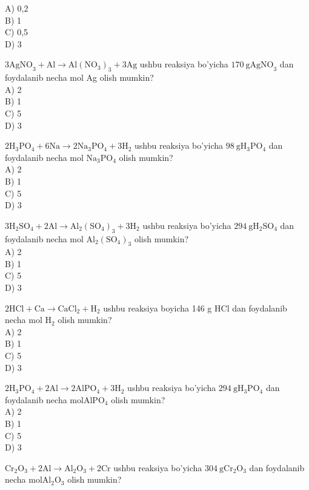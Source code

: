 A) 0,2\\
B) 1\\
C) 0,5\\
D) 3
  \item $3 \mathrm{AgNO}_{3}+\mathrm{Al} \rightarrow \mathrm{Al}\left(\mathrm{NO}_{3}\right)_{3}+3 \mathrm{Ag}$ ushbu reaksiya bo'yicha $170 \mathrm{~g} \mathrm{AgNO}_{3}$ dan foydalanib necha mol Ag olish mumkin?\\
A) 2\\
B) 1\\
C) 5\\
D) 3
  \item $2 \mathrm{H}_{3} \mathrm{PO}_{4}+6 \mathrm{Na} \rightarrow 2 \mathrm{Na}_{3} \mathrm{PO}_{4}+3 \mathrm{H}_{2}$ ushbu reaksiya bo'yicha $98 \mathrm{~g} \mathrm{H}_{3} \mathrm{PO}_{4}$ dan foydalanib necha mol $\mathrm{Na}_{3} \mathrm{PO}_{4}$ olish mumkin?\\
A) 2\\
B) 1\\
C) 5\\
D) 3
  \item $3 \mathrm{H}_{2} \mathrm{SO}_{4}+2 \mathrm{Al} \rightarrow \mathrm{Al}_{2}\left(\mathrm{SO}_{4}\right)_{3}+3 \mathrm{H}_{2}$ ushbu reaksiya bo'yicha $294 \mathrm{~g} \mathrm{H}_{2} \mathrm{SO}_{4}$ dan foydalanib necha mol $\mathrm{Al}_{2}\left(\mathrm{SO}_{4}\right)_{3}$ olish mumkin?\\
A) 2\\
B) 1\\
C) 5\\
D) 3
  \item $2 \mathrm{HCl}+\mathrm{Ca} \rightarrow \mathrm{CaCl}_{2}+\mathrm{H}_{2}$ ushbu reaksiya boyicha 146 g HCl dan foydalanib necha mol $\mathrm{H}_{2}$ olish mumkin?\\
A) 2\\
B) 1\\
C) 5\\
D) 3
  \item $2 \mathrm{H}_{3} \mathrm{PO}_{4}+2 \mathrm{Al} \rightarrow 2 \mathrm{AlPO}_{4}+3 \mathrm{H}_{2}$ ushbu reaksiya bo'yicha $294 \mathrm{~g} \mathrm{H}_{3} \mathrm{PO}_{4}$ dan foydalanib necha $\mathrm{mol} \mathrm{AlPO}_{4}$ olish mumkin?\\
A) 2\\
B) 1\\
C) 5\\
D) 3
  \item $\mathrm{Cr}_{2} \mathrm{O}_{3}+2 \mathrm{Al} \rightarrow \mathrm{Al}_{2} \mathrm{O}_{3}+2 \mathrm{Cr}$ ushbu reaksiya bo'yicha $304 \mathrm{~g} \mathrm{Cr}_{2} \mathrm{O}_{3}$ dan foydalanib necha $\mathrm{mol} \mathrm{Al}_{2} \mathrm{O}_{3}$ olish mumkin?\\
